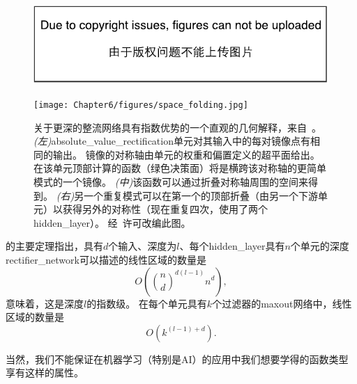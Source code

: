 \begin{figure}[!htb]
\ifOpenSource
\centerline{\includegraphics{figure.pdf}}
\else
\centerline{\texttt{[image: Chapter6/figures/space\_folding.jpg]}}
\fi
\caption{ %
关于更深的整流网络具有指数优势的一个直观的几何解释，来自~\cite{Montufar-et-al-NIPS2014}。 
\emph{(左)}\gls{absolute_value_rectification}单元对其输入中的每对镜像点有相同的输出。
镜像的对称轴由单元的权重和偏置定义的超平面给出。 在该单元顶部计算的函数（绿色决策面）将是横跨该对称轴的更简单模式的一个镜像。 
\emph{(中)}该函数可以通过折叠对称轴周围的空间来得到。
\emph{(右)}另一个重复模式可以在第一个的顶部折叠（由另一个下游单元）以获得另外的对称性（现在重复四次，使用了两个\gls{hidden_layer}）。 
经~\cite{Montufar-et-al-NIPS2014}许可改编此图。}
\label{fig:chap6_space_folding}
\end{figure}


\cite{Montufar-et-al-NIPS2014}的主要定理指出，具有$d$个输入、深度为$l$、每个\gls{hidden_layer}具有$n$个单元的深度\gls{rectifier_network}可以描述的线性区域的数量是
\begin{equation}
O \left ( {n \choose d}^{d(l-1)} n^d \right ),
\end{equation}
意味着，这是深度$l$的指数级。
在每个单元具有$k$个过滤器的maxout网络中，线性区域的数量是
\begin{equation}
O \left ( k^{(l-1)+d} \right ).
\end{equation}


当然，我们不能保证在机器学习（特别是AI）的应用中我们想要学得的函数类型享有这样的属性。

